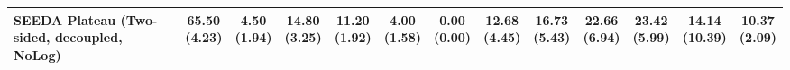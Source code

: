 \begin{table}[H]
{\begin{tabular}{l|cccccc|cccccc}
SEEDA Plateau (Two-sided, decoupled, NoLog) & \bfseries \makecell{65.50 \\ (4.23)} & \makecell{4.50 \\ (1.94)} & {\cellcolor[HTML]{C8E6C9}} \makecell{14.80 \\ (3.25)} & \makecell{11.20 \\ (1.92)} & \makecell{4.00 \\ (1.58)} & \makecell{0.00 \\ (0.00)} & \makecell{12.68 \\ (4.45)} & \makecell{16.73 \\ (5.43)} & {\cellcolor[HTML]{C8E6C9}} \makecell{22.66 \\ (6.94)} & \bfseries \makecell{23.42 \\ (5.99)} & \makecell{14.14 \\ (10.39)} & \makecell{10.37 \\ (2.09)} \\
\bottomrule
\end{tabular}
}%
\end{table}
